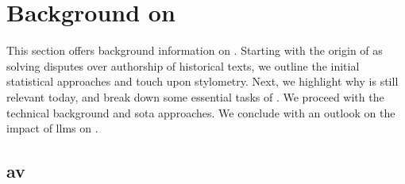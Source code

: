 \chapter{Background on \ai{}}
\label{chap:authorship_identification}

This section offers background information on \ai{}.
Starting with the origin of \ai{} as solving disputes over authorship of historical texts, we outline the initial statistical approaches and touch upon stylometry.
Next, we highlight why \ai{} is still relevant today, and break down some essential tasks of \ai{}.
We proceed with the technical background and \ac{sota} approaches.
We conclude with an outlook on the impact of \acp{llm} on \ai{}.

















\section{\acl{av}}





